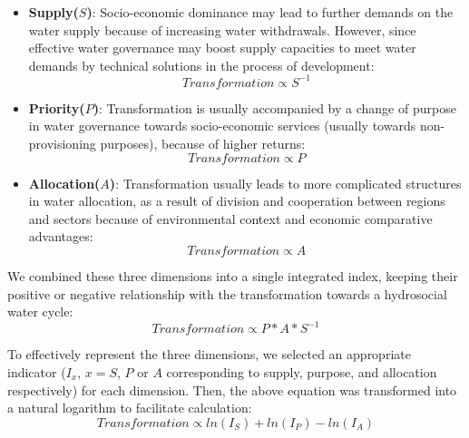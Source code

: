	\begin{itemize}
		\item \textbf{Supply($S$)}: Socio-economic dominance may lead to further demands on the water supply because of increasing water withdrawals. However, since effective water governance may boost supply capacities to meet water demands by technical solutions in the process of development:
		\begin{equation}
			Transformation \propto S^{-1}
		\end{equation}


		\item \textbf{Priority($P$)}: Transformation is usually accompanied by a change of purpose in water governance towards socio-economic services (usually towards non-provisioning purposes), because of higher returns:
		\begin{equation}
			Transformation \propto P
		\end{equation}

		\item \textbf{Allocation($A$)}: Transformation usually leads to more complicated structures in water allocation, as a result of division and cooperation between regions and sectors because of environmental context and economic comparative advantages:
		\begin{equation}
			Transformation \propto A
		\end{equation}

	\end{itemize}

	We combined these three dimensions into a single integrated index, keeping their positive or negative relationship with the transformation towards a hydrosocial water cycle:
	\begin{equation}
		Transformation \propto P*A*S^{-1}
	\end{equation}

	To effectively represent the three dimensions, we selected an appropriate indicator ($I_x$, $x=S$, $P$ or $A$ corresponding to supply, purpose, and allocation respectively) for each dimension. Then, the above equation was transformed into a natural logarithm to facilitate calculation:
	\begin{equation}
		Transformation \propto ln(I_S) + ln(I_P) - ln(I_A)
	\end{equation}

